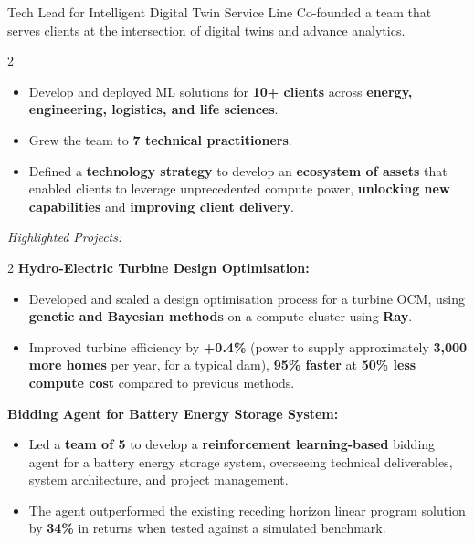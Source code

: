 \documentclass[a4paper]{deedy-resume} %
\begin{document}
\vspace{-5pt}
\begin{callout}{Tech Lead for Intelligent Digital Twin Service Line}
\linebreak
    Co-founded a team that serves clients at the intersection of digital twins and advance analytics.
    \vspace{-10pt}
    \begin{multicols}{2}
        \begin{itemize}
            \item Develop and deployed ML solutions for \textbf{10+ clients} across \textbf{energy, engineering, logistics, and life sciences}. 
            \item Grew the team to \textbf{7 technical practitioners}.
            \columnbreak
            \item Defined a \textbf{technology strategy} to develop an \textbf{ecosystem of assets} that enabled clients to leverage unprecedented compute power, \textbf{unlocking new capabilities} and \textbf{improving client delivery}.
        \end{itemize}
    \end{multicols}
\end{callout}
\vspace{-2pt}
\textit{Highlighted Projects:}
\vspace{-10pt}
\begin{multicols}{2}
    \vspace{0.1cm}
    \textbf{Hydro-Electric Turbine Design Optimisation:}
    \begin{itemize}
        \item Developed and scaled a design optimisation process for a turbine OCM, using \textbf{genetic and Bayesian methods} on a compute cluster using \textbf{Ray}.
        \item Improved turbine efficiency by \textbf{+0.4\%} (power to supply approximately \textbf{3,000 more homes} per year, for a typical dam), \textbf{95\% faster} at \textbf{50\% less compute cost} compared to previous methods.
    \end{itemize}

    \columnbreak

    \vspace{0.1cm}
    \textbf{Bidding Agent for Battery Energy Storage System:}
    \begin{itemize}
        \item Led a \textbf{team of 5} to develop a \textbf{reinforcement learning-based} bidding agent for a battery energy storage system, overseeing technical deliverables, system architecture, and project management.
        \item The agent outperformed the existing receding horizon linear program solution by \textbf{34\%} in returns when tested against a simulated benchmark.
    \end{itemize}

\end{multicols}
\end{document}
